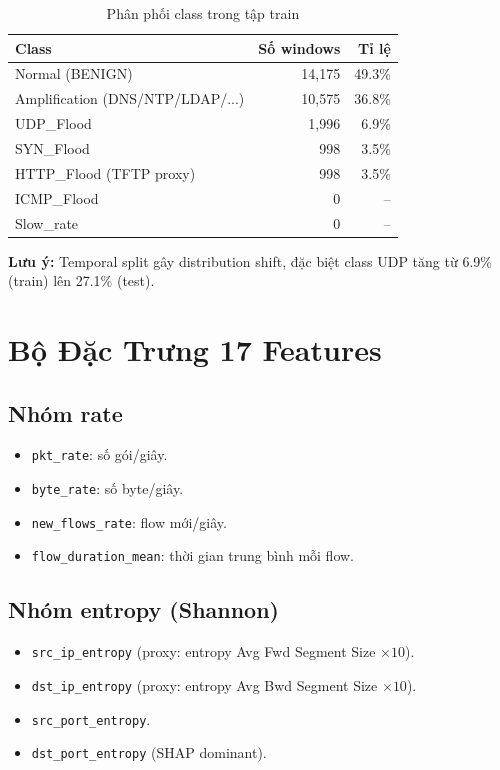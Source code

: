 \documentclass[12pt,a4paper]{article}
\begin{document}
\begin{table}[H]
\centering
\caption{Phân phối class trong tập train}
\begin{tabular}{lrr}
\toprule
\textbf{Class} & \textbf{Số windows} & \textbf{Tỉ lệ} \\
\midrule
Normal (BENIGN) & 14,175 & 49.3\% \\
Amplification (DNS/NTP/LDAP/...) & 10,575 & 36.8\% \\
UDP\_Flood & 1,996 & 6.9\% \\
SYN\_Flood & 998 & 3.5\% \\
HTTP\_Flood (TFTP proxy) & 998 & 3.5\% \\
ICMP\_Flood & 0 & -- \\
Slow\_rate & 0 & -- \\
\bottomrule
\end{tabular}
\end{table}

\textbf{Lưu ý:} Temporal split gây distribution shift, đặc biệt class UDP tăng từ 6.9\% (train) lên 27.1\% (test).

\section{Bộ Đặc Trưng 17 Features}

\subsection{Nhóm rate}
\begin{itemize}[leftmargin=2em]
\item \texttt{pkt\_rate}: số gói/giây.
\item \texttt{byte\_rate}: số byte/giây.
\item \texttt{new\_flows\_rate}: flow mới/giây.
\item \texttt{flow\_duration\_mean}: thời gian trung bình mỗi flow.
\end{itemize}

\subsection{Nhóm entropy (Shannon)}
\begin{itemize}[leftmargin=2em]
\item \texttt{src\_ip\_entropy} (proxy: entropy Avg Fwd Segment Size $\times 10$).
\item \texttt{dst\_ip\_entropy} (proxy: entropy Avg Bwd Segment Size $\times 10$).
\item \texttt{src\_port\_entropy}.
\item \texttt{dst\_port\_entropy} (SHAP dominant).
\end{itemize}
\end{document}

